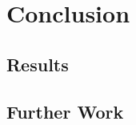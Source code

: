 \chapter{Conclusion}
\section{Results}
\begin{comment}


From figures (\ref{fig:51}-\ref{fig:53}) it is clear that the heat flow dynamics in numerical cases follow that of the analytical case. This can be further concurred through the line plots in figures (\ref{fig:56}-\ref{fig:58}). From figure \ref{fig:56} it can be concluded that both CD and PDDS perform similarly when subjected to the clean grid during the simulations. Also, it can be seen that from the figure (\ref{fig:57}), PDDS is closer to the analytical solution in most of the regions when compared to CD. Further, from the figure (\ref{fig:58}) it can be seen that only PDDS produces good results while CD fails in this case. Therefore, from the obtained results it can be concluded that PDDS performs better than CD when the grid consists of unfavorable cells.
\end{comment}
\section{Further Work}
\begin{comment}
With the results obtained from PDDS being on par with the analytical solution, there is an availability of a working model for this new scheme. This model will be used as a base for implementing this scheme in the in-house CFD code. With the understanding of the behavior of the numerical scheme in capturing the gradients in a domain with unfavorable cells, this scheme will be further tested for several cases at larger scales which involves more variables. This scheme will be further tested with an engineering problem (for example, turbine blade optimization). Finally, a test for robustness and accuracy of the scheme to solve diffusive fluxes for studying the effect of the mesh quality (skewness, stretching, aspect ratio, etc.) will be conducted.
\end{comment}
